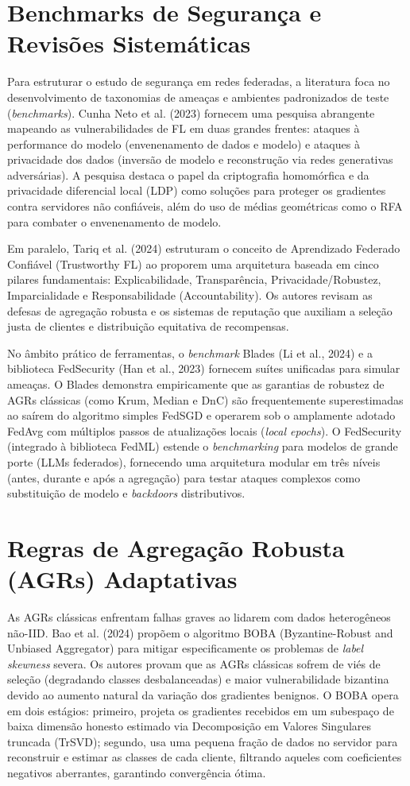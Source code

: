 \documentclass[11pt,a4paper]{article}
\begin{document}
\section{Benchmarks de Segurança e Revisões Sistemáticas}
Para estruturar o estudo de segurança em redes federadas, a literatura foca no desenvolvimento de taxonomias de ameaças e ambientes padronizados de teste (\emph{benchmarks}). Cunha Neto et al. (2023) fornecem uma pesquisa abrangente mapeando as vulnerabilidades de FL em duas grandes frentes: ataques à performance do modelo (envenenamento de dados e modelo) e ataques à privacidade dos dados (inversão de modelo e reconstrução via redes generativas adversárias). A pesquisa destaca o papel da criptografia homomórfica e da privacidade diferencial local (LDP) como soluções para proteger os gradientes contra servidores não confiáveis, além do uso de médias geométricas como o RFA para combater o envenenamento de modelo.

Em paralelo, Tariq et al. (2024) estruturam o conceito de Aprendizado Federado Confiável (Trustworthy FL) ao proporem uma arquitetura baseada em cinco pilares fundamentais: Explicabilidade, Transparência, Privacidade/Robustez, Imparcialidade e Responsabilidade (Accountability). Os autores revisam as defesas de agregação robusta e os sistemas de reputação que auxiliam a seleção justa de clientes e distribuição equitativa de recompensas.

No âmbito prático de ferramentas, o \emph{benchmark} Blades (Li et al., 2024) e a biblioteca FedSecurity (Han et al., 2023) fornecem suítes unificadas para simular ameaças. O Blades demonstra empiricamente que as garantias de robustez de AGRs clássicas (como Krum, Median e DnC) são frequentemente superestimadas ao saírem do algoritmo simples FedSGD e operarem sob o amplamente adotado FedAvg com múltiplos passos de atualizações locais (\emph{local epochs}). O FedSecurity (integrado à biblioteca FedML) estende o \emph{benchmarking} para modelos de grande porte (LLMs federados), fornecendo uma arquitetura modular em três níveis (antes, durante e após a agregação) para testar ataques complexos como substituição de modelo e \emph{backdoors} distributivos.

\section{Regras de Agregação Robusta (AGRs) Adaptativas}
As AGRs clássicas enfrentam falhas graves ao lidarem com dados heterogêneos não-IID. Bao et al. (2024) propõem o algoritmo BOBA (Byzantine-Robust and Unbiased Aggregator) para mitigar especificamente os problemas de \emph{label skewness} severa. Os autores provam que as AGRs clássicas sofrem de viés de seleção (degradando classes desbalanceadas) e maior vulnerabilidade bizantina devido ao aumento natural da variação dos gradientes benignos. O BOBA opera em dois estágios: primeiro, projeta os gradientes recebidos em um subespaço de baixa dimensão honesto estimado via Decomposição em Valores Singulares truncada (TrSVD); segundo, usa uma pequena fração de dados no servidor para reconstruir e estimar as classes de cada cliente, filtrando aqueles com coeficientes negativos aberrantes, garantindo convergência ótima.
\end{document}
